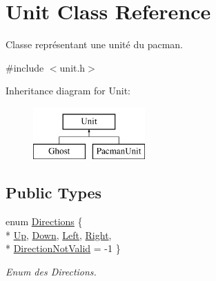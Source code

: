\hypertarget{class_unit}{}\section{Unit Class Reference}
\label{class_unit}


Classe représentant une unité du pacman.  




{\ttfamily \#include $<$unit.\+h$>$}

Inheritance diagram for Unit\+:\begin{figure}[H]
\begin{center}
\leavevmode
\includegraphics[height=2.000000cm]{class_unit}
\end{center}
\end{figure}
\subsection*{Public Types}
\begin{DoxyCompactItemize}
\item 
enum \hyperlink{class_unit_a198e5fe8c952e2f1e7e9524a914aa0ed}{Directions} \{ \\*
\hyperlink{class_unit_a198e5fe8c952e2f1e7e9524a914aa0edadbae641fa2ba279643d63ee3e071c07a}{Up}, 
\hyperlink{class_unit_a198e5fe8c952e2f1e7e9524a914aa0eda6be5329b08ddd45e62b4d70ae9940f09}{Down}, 
\hyperlink{class_unit_a198e5fe8c952e2f1e7e9524a914aa0eda0d0c9e2b7e0bc40ed55e26b44d2eeae6}{Left}, 
\hyperlink{class_unit_a198e5fe8c952e2f1e7e9524a914aa0eda4b5bae12923642cf30197c5ea676154c}{Right}, 
\\*
\hyperlink{class_unit_a198e5fe8c952e2f1e7e9524a914aa0eda2932642ae5d44019d2d191842b1c818d}{Direction\+Not\+Valid} = -\/1
 \}\begin{DoxyCompactList}\small\item\em Enum des Directions. \end{DoxyCompactList}
\end{DoxyCompactItemize}
